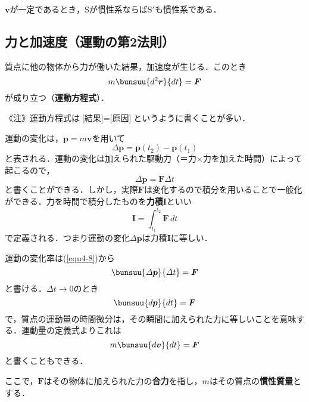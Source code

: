 $\bm{v}$が一定であるとき，$\mathrm{S}$が慣性系ならば$\mathrm{S}'$も慣性系である．



\subsection{力と加速度（運動の第2法則）}
\label{sec4-2-3}

\begin{tcolorbox}[colback=white]
	質点に他の物体から力が働いた結果，加速度が生じる．このとき
	\begin{equation}
		m\bunsuu{d^2\bm{r}}{dt} = \bm{F}
	\end{equation}
が成り立つ（\textbf{運動方程式}）．
\end{tcolorbox}

《注》運動方程式は$\text{[結果]} = \text{[原因]}$というように書くことが多い．

運動の変化は，$\bm{p} = m\bm{v}$を用いて
\begin{equation*}
	\varDelta \bm{p} = \bm{p}(t_2) - \bm{p}(t_1)
\end{equation*}
と表される．運動の変化は加えられた駆動力（＝力×力を加えた時間）によって起こるので，
\begin{equation}
	\label{equ4-8}
	\varDelta \bm{p} = \bm{F}\varDelta t
\end{equation}
と書くことができる．しかし，実際$\bm{F}$は変化するので積分を用いることで一般化ができる．力を時間で積分したものを\textbf{力積}$\bm{I}$といい
\begin{equation*}
	\bm{I} = \int_{t_1}^{t_2} \bm{F}\,dt
\end{equation*}
で定義される．つまり運動の変化$\varDelta\bm{p}$は力積$\bm{I}$に等しい．

運動の変化率は(\ref{equ4-8})から
\begin{equation*}
	\bunsuu{\varDelta \bm{p}}{\varDelta t} = \bm{F}
\end{equation*}
と書ける．$\varDelta t \to 0$のとき
\begin{equation}
	\bunsuu{d\bm{p}}{dt} = \bm{F}
\end{equation}
で，質点の運動量の時間微分は，その瞬間に加えられた力に等しいことを意味する．運動量の定義式よりこれは
\begin{equation}
	m\bunsuu{d\bm{v}}{dt} = \bm{F}
\end{equation}
と書くこともできる．

ここで，$\bm{F}$はその物体に加えられた力の\textbf{合力}を指し，$m$はその質点の\textbf{慣性質量}とする．

